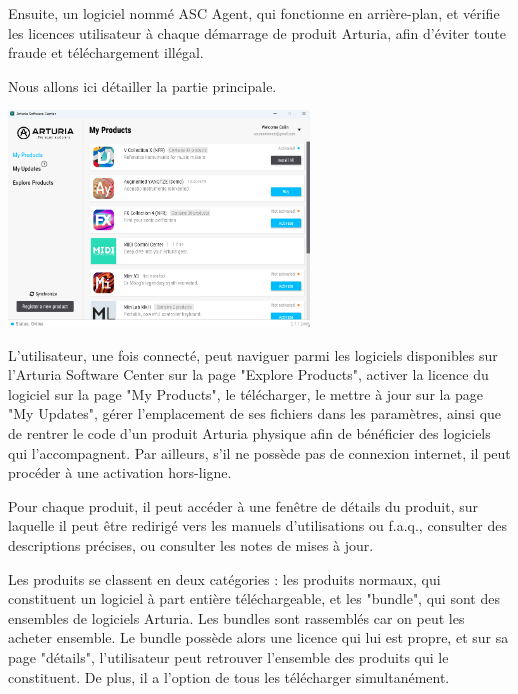 \documentclass[francais]{rapportPFE}  %
\begin{document}
Ensuite, un logiciel nommé ASC Agent, qui fonctionne en arrière-plan, et vérifie les licences utilisateur à chaque démarrage de produit Arturia, afin d'éviter toute fraude et téléchargement illégal.

Nous allons ici détailler la partie principale.

\begin{center}
	\centering
	\includegraphics[width=0.6\textwidth]{graphics/asc_existant.png}
	\begin{tiny}
	\end{tiny}
	\label{fig}
\end{center}

L'utilisateur, une fois connecté, peut naviguer parmi les logiciels disponibles sur l'Arturia Software Center sur la page "Explore Products", activer la licence du logiciel sur la page "My Products", le télécharger, le mettre à jour sur la page "My Updates", gérer l'emplacement de ses fichiers dans les paramètres, ainsi que de rentrer le code d'un produit Arturia physique afin de bénéficier des logiciels qui l'accompagnent.  Par ailleurs, s'il ne possède pas de connexion internet, il peut procéder à une activation hors-ligne. 

Pour chaque produit, il peut accéder à une fenêtre de détails du produit, sur laquelle il peut être redirigé vers les manuels d'utilisations ou f.a.q., consulter des descriptions précises, ou consulter les notes de mises à jour. 

Les produits se classent en deux catégories : les produits normaux, qui constituent un logiciel à part entière téléchargeable, et les "bundle", qui sont des ensembles de logiciels Arturia. Les bundles sont rassemblés car on peut les acheter ensemble. Le bundle possède alors une licence qui lui est propre, et sur sa page "détails", l'utilisateur peut retrouver l'ensemble des produits qui le constituent. De plus, il a l'option de tous les télécharger simultanément.
\end{document}
